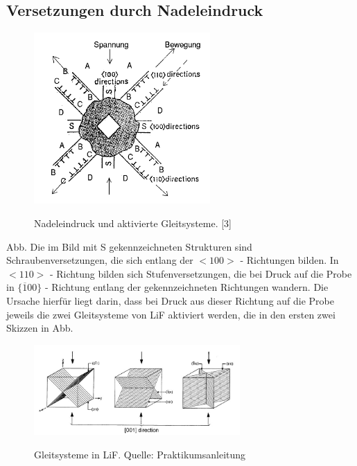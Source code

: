     \subsection{Versetzungen durch Nadeleindruck}
	\begin{figure}[H]
            \centering
            \includegraphics[width=0.6\textwidth]{Images/Question3.PNG}
            \label{FigNadel}
            \caption{Nadeleindruck und aktivierte Gleitsysteme. [3]}
        \end{figure}
	
	Abb. %
	Die im Bild mit S gekennzeichneten Strukturen sind Schraubenversetzungen, die sich entlang der $<100>$ - Richtungen bilden. In $<110>$ - Richtung bilden sich
	Stufenversetzungen, die bei Druck auf die Probe in $\{ \overline{1}00\}$ - Richtung entlang der gekennzeichneten Richtungen wandern. Die Ursache hierfür liegt
	darin, dass bei Druck aus dieser Richtung auf die Probe jeweils die zwei Gleitsysteme von LiF aktiviert werden, die in den ersten zwei Skizzen in Abb. 
	

	\begin{figure}[H]
            \centering
            \includegraphics[width=0.7\textwidth]{Images/Gleitsysteme.JPG}
            \label{FigGleitGel}
            \caption{Gleitsysteme in LiF. Quelle: Praktikumsanleitung}
        \end{figure}


	